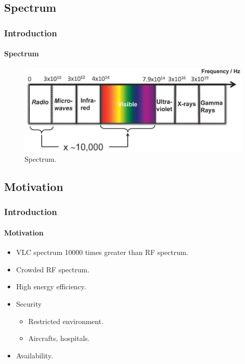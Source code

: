 \documentclass[mathserif]{beamer}
\newcommand{\wait}{\vfill}
\begin{document}
\subsection{Spectrum}
\begin{frame}
\frametitle{Introduction}
\framesubtitle{Spectrum}
	\begin{figure}
		\centering
		\includegraphics[width=\linewidth]{figuras/spectrum}
		\caption{Spectrum.}
		\label{fig:spectrum}
	\end{figure}
\end{frame}	

\subsection{Motivation}
\begin{frame}
\frametitle{Introduction}
\framesubtitle{Motivation}
	\begin{itemize}
		\item VLC spectrum 10000 times greater than RF spectrum. \wait
		\item Crowded RF spectrum. \wait
		\item High energy efficiency. \wait
		\item Security
			\begin{itemize}
				\item Restricted environment.
				\item Aircrafts, hospitals. \wait
			\end{itemize}
		\item Availability.
	\end{itemize}

\end{frame}	

\end{document}

